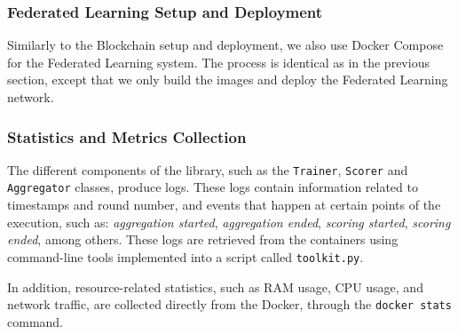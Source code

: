 \subsubsection{Federated Learning Setup and Deployment}

Similarly to the Blockchain setup and deployment, we also use Docker Compose for the Federated Learning system. The process is identical as in the previous section, except that we only build the images and deploy the Federated Learning network.

\subsubsection{Statistics and Metrics Collection}

The different components of the library, such as the \texttt{Trainer}, \texttt{Scorer} and \texttt{Aggregator} classes, produce logs. These logs contain information related to timestamps and round number, and events that happen at certain points of the execution, such as: \textit{aggregation started}, \textit{aggregation ended}, \textit{scoring started}, \textit{scoring ended}, among others. These logs are retrieved from the containers using command-line tools implemented into a script called \texttt{toolkit.py}.

In addition, resource-related statistics, such as RAM usage, CPU usage, and network traffic, are collected directly from the Docker, through the \texttt{docker stats} command.
